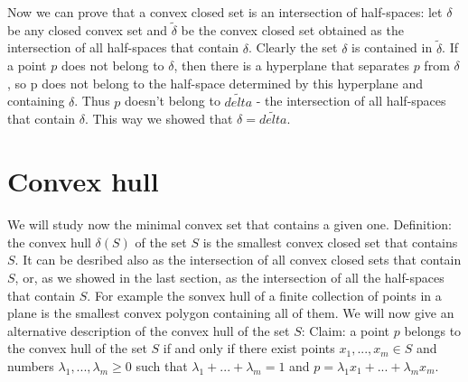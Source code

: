 Now we can prove that a convex closed set is an intersection of half-spaces: let $\delta$ be any closed convex set and $\tilde{\delta}$ be the convex closed set obtained as the intersection of all half-spaces that contain $\delta$. Clearly the set $\delta$ is contained in $\tilde{\delta}$. If a point $p$ does not belong to $\delta$, then there is a hyperplane that separates $p$ from $\delta$, so p does not belong to the half-space determined by this hyperplane and containing $\delta$. Thus $p$ doesn't belong to $\tilde{delta}$ - the intersection of all half-spaces that contain $\delta$. This way we showed that $\delta=\tilde{delta}$.
\section{Convex hull}
We will study now the minimal convex set that contains a given one.
Definition: the convex hull $\delta(S)$ of the set $S$ is the smallest convex closed set that contains $S$. It can be desribed also as the intersection of all convex closed sets that contain $S$, or, as we showed in the last section, as the intersection of all the half-spaces that contain $S$.
For example the sonvex hull of a finite collection of points in a plane is the smallest convex polygon containing all of them.
We will now give an alternative description of the convex hull of the set $S$:
Claim: a point $p$ belongs to the convex hull of the set $S$ if and only if there exist points $x_1,...,x_m\in S$ and numbers $\lambda_1,...,\lambda_m\ge0$ such that $\lambda_1+...+\lambda_m=1$ and $p=\lambda_1 x_1+...+\lambda_m x_m$.

